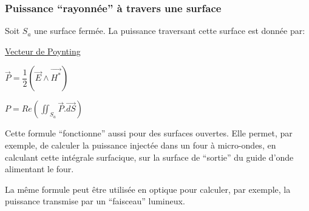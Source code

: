 \documentclass[
10pt,
aspectratio=169,
]{beamer}
\begin{document}
\begin{frame} 
\frametitle{Puissance ``rayonnée'' à travers une surface}

Soit $S_a$ une surface fermée. La puissance traversant cette surface est donnée par:
\begin{center} \begin{tcolorbox}[colframe=red,width=7cm]
\center\underline{Vecteur de Poynting}

$\vec{P}=\dfrac{1}{2}(\vec{E}\wedge\vec{H^*})$

$P=Re(\iint_{S_a} \vec{P}.\vec{dS})$
\end{tcolorbox}\end{center}

Cette formule ``fonctionne'' aussi pour des surfaces ouvertes. Elle permet, par exemple, de calculer la puissance injectée dans
un four à micro-ondes, en calculant cette intégrale surfacique, sur la surface de ``sortie'' du guide d'onde alimentant le four.

\vspace{0.5cm}
La même formule peut être utilisée en optique pour calculer, par exemple, la puissance transmise par un ``faisceau'' lumineux.


\end{frame}

\end{document}

